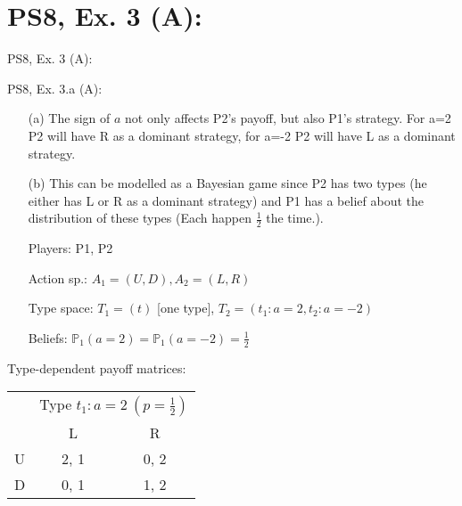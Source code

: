 \section{PS8, Ex. 3 (A): }

\begin{frame}{PS8, Ex. 3 (A): }
  \begin{multicols}{2}
    \vfill\null\columnbreak
    \vfill\null
  \end{multicols}
\end{frame}

\begin{frame}{PS8, Ex. 3.a (A): }
  \begin{multicols}{2}
    \begin{itemize}
    \item[(a)] The sign of $a$ not only affects P2's payoff, but also P1's strategy. For a=2 P2 will have R as a dominant strategy, for a=-2 P2 will have L as a dominant strategy.
    \item[(b)] This can be modelled as a Bayesian game since P2 has two types (he either has L or R as a dominant strategy) and P1 has a belief about the distribution of these types (Each happen $\frac{1}{2}$ the time.). 
        \item[Players:] P1, P2
        \item[Action sp.:] $A_1=(U,D),A_2=(L,R)$
        \item[Type space:] $T_1=(t)$ [one type], $T_2=(t_1:a=2,t_2:a=-2)$
        \item[Beliefs:] $\mathbb{P}_1(a=2)=\mathbb{P}_1(a=-2)=\frac{1}{2}$
        \vfill\null\columnbreak
    \end{itemize}
    Type-dependent payoff matrices:
    \vspace{-8pt}
    \begin{table}
        \begin{tabular}{l|c|c|}
        \multicolumn{1}{c}{} & \multicolumn{2}{c}{Type $t_1:a=2\ (p=\frac{1}{2})$} \\
        \multicolumn{1}{c}{} & \multicolumn{1}{c}{L} & \multicolumn{1}{c}{R} \\\cline{2-3}
        U & 2, 1 & 0, 2 \\\cline{2-3}
        D & 0, 1 & 1, 2 \\\cline{2-3}
      \end{tabular}
    \end{table}
    \vspace{-8pt}
    \begin{table}
      \begin{tabular}{l|c|c|}

\end{tabular}
\end{table}
\end{multicols}
\end{frame}
